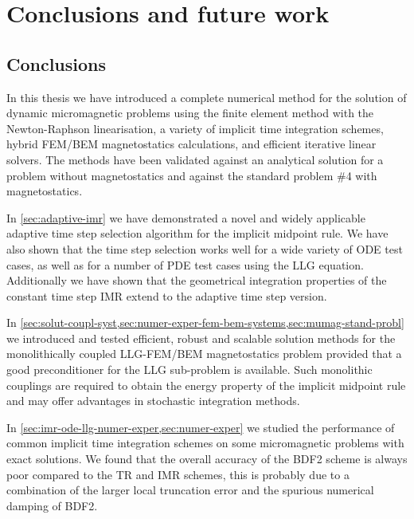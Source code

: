 \chapter{Conclusions and future work}

\section{Conclusions}

In this thesis we have introduced a complete numerical method for the solution of dynamic micromagnetic problems using the finite element method with the Newton-Raphson linearisation, a variety of implicit time integration schemes, hybrid FEM/BEM magnetostatics calculations, and efficient iterative linear solvers.
The methods have been validated against an analytical solution for a problem without magnetostatics and against the \mumag standard problem \#4 with magnetostatics.

In \cref{sec:adaptive-imr} we have demonstrated a novel and widely applicable adaptive time step selection algorithm for the implicit midpoint rule.
We have also shown that the time step selection works well for a wide variety of ODE test cases, as well as for a number of PDE test cases using the LLG equation.
Additionally we have shown that the geometrical integration properties of the constant time step IMR extend to the adaptive time step version.

In \cref{sec:solut-coupl-syst,sec:numer-exper-fem-bem-systems,sec:mumag-stand-probl} we introduced and tested efficient, robust and scalable solution methods for the monolithically coupled LLG-FEM/BEM magnetostatics problem provided that a good preconditioner for the LLG sub-problem is available.
Such monolithic couplings are required to obtain the energy property of the implicit midpoint rule and may offer advantages in stochastic integration methods.

In \cref{sec:imr-ode-llg-numer-exper,sec:numer-exper} we studied the performance of common implicit time integration schemes on some micromagnetic problems with exact solutions.
We found that the overall accuracy of the BDF2 scheme is always poor compared to the TR and IMR schemes, this is probably due to a combination of the larger local truncation error and the spurious numerical damping of BDF2.

